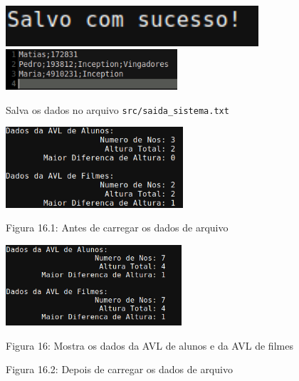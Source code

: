\documentclass[12pt,a4paper,portuguese]{article}
\begin{document}
        \begin{figure}[H]
            \centering
            \includegraphics[height=1.5cm]{imgs/salva_sistema.png}
            \includegraphics[height=1.5cm]{imgs/salva_sistema_gerado.png}
            \caption{Salva os dados no arquivo \texttt{src/saida\_sistema.txt}}
        \end{figure}

        \begin{figure}[H]
            \centering
            \includegraphics[height=3cm]{imgs/mostra_dados_arvores.png}
            \vspace{-10px}
            \caption*{Figura 16.1: Antes de carregar os dados de arquivo}
            \includegraphics[height=3cm]{imgs/mostra_dados_arvores_2.png}
            \vspace{-10px}
            \caption*{Figura 16.2: Depois de carregar os dados de arquivo}
            Figura 16: Mostra os dados da AVL de alunos e da AVL de filmes
        \end{figure}
\end{document}
